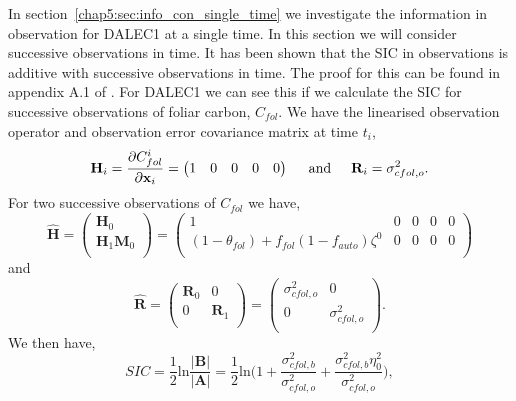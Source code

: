 In section~\ref{chap5:sec:info_con_single_time} we investigate the information in observation for DALEC1 at a single time. In this section we will consider successive observations in time. It has been shown that the SIC in observations is additive with successive observations in time. The proof for this can be found in appendix A.1 of \citet{Fowler2012}. For DALEC1 we can see this if we calculate the SIC for successive observations of foliar carbon, \(C_{fol}\). We have the linearised observation operator and observation error covariance matrix at time $t_i$,
\begin{equation}
\mathbf{H}_{i} = \frac{\partial C_{fol}^{i}}{\partial \textbf{x}_i} = \begin{pmatrix}
1 & 0 & 0 & 0 & 0
\end{pmatrix}
\hspace{5mm} \text{and} \hspace{5mm}
\mathbf{R}_i=\sigma_{cfol,o}^{2}.
\end{equation}
For two successive observations of \(C_{fol}\) we have,
\begin{equation}
\hat{\mathbf{H}}=
\begin{pmatrix}
\mathbf{H}_0 \\
\mathbf{H}_1\mathbf{M}_0\\
\end{pmatrix}
=
\begin{pmatrix}
1 & 0 & 0 & 0 & 0 \\
(1-\theta_{fol})+f_{fol}(1-f_{auto})\zeta^0 & 0 & 0 & 0 & 0\\
\end{pmatrix}
\end{equation}
and
\begin{equation}
\hat{\mathbf{R}}=
\begin{pmatrix}
\mathbf{R}_0 & 0  \\
0 & \mathbf{R}_1  \\
\end{pmatrix}
=
\begin{pmatrix}
\sigma_{cfol,o}^{2} & 0  \\
0 & \sigma_{cfol,o}^{2}  \\
\end{pmatrix}.
\end{equation}
We then have,
\begin{equation}
SIC = \frac{1}{2}\text{ln}\frac{| \mathbf{B} |}{| \mathbf{A}|} =\frac{1}{2}\text{ln} \bigg(1+\frac{\sigma_{cfol,b}^{2}}{\sigma_{cfol,o}^{2}}+\frac{\sigma_{cfol,b}^{2}\eta_0^{2}}{\sigma_{cfol,o}^{2}} \bigg), \label{chap5:eq:sic_2cfol}
\end{equation}
